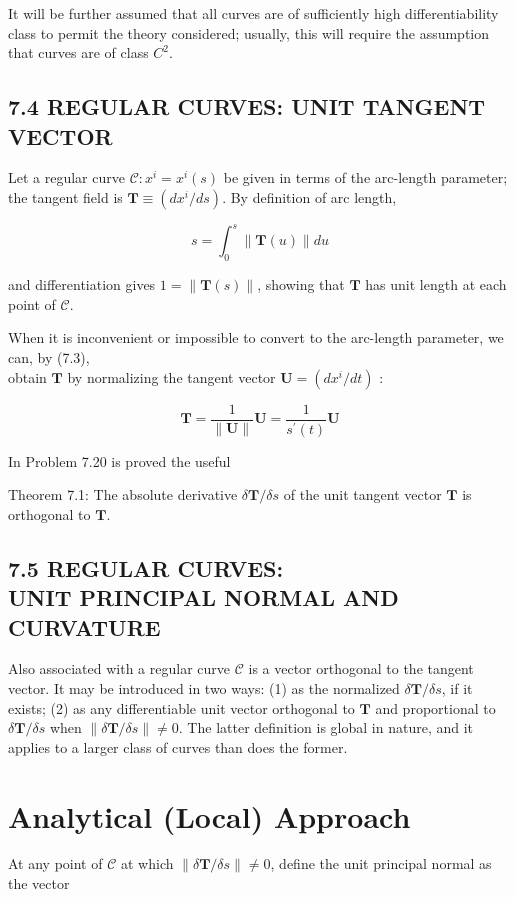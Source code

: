 \documentclass[10pt]{article}
\begin{document}
It will be further assumed that all curves are of sufficiently high differentiability class to permit the theory considered; usually, this will require the assumption that curves are of class $C^{2}$.

\subsection*{7.4 REGULAR CURVES: UNIT TANGENT VECTOR}
Let a regular curve $\mathscr{C}: x^{i}=x^{i}(s)$ be given in terms of the arc-length parameter; the tangent field is $\mathbf{T} \equiv\left(d x^{i} / d s\right)$. By definition of arc length,

$$
s=\int_{0}^{s}\|\mathbf{T}(u)\| d u
$$

and differentiation gives $1=\|\mathbf{T}(s)\|$, showing that $\mathbf{T}$ has unit length at each point of $\mathscr{C}$.

When it is inconvenient or impossible to convert to the arc-length parameter, we can, by (7.3),\\
obtain $\mathbf{T}$ by normalizing the tangent vector $\mathbf{U}=\left(d x^{i} / d t\right)$ :


\begin{equation*}
\mathbf{T}=\frac{1}{\|\mathbf{U}\|} \mathbf{U}=\frac{1}{s^{\prime}(t)} \mathbf{U} \tag{7.4}
\end{equation*}


In Problem 7.20 is proved the useful

Theorem 7.1: The absolute derivative $\delta \mathbf{T} / \delta s$ of the unit tangent vector $\mathbf{T}$ is orthogonal to $\mathbf{T}$.

\subsection*{7.5 REGULAR CURVES: \\
 UNIT PRINCIPAL NORMAL AND CURVATURE}
Also associated with a regular curve $\mathscr{C}$ is a vector orthogonal to the tangent vector. It may be introduced in two ways: (1) as the normalized $\delta \mathbf{T} / \delta s$, if it exists; (2) as any differentiable unit vector orthogonal to $\mathbf{T}$ and proportional to $\delta \mathbf{T} / \delta s$ when $\|\delta \mathbf{T} / \delta s\| \neq 0$. The latter definition is global in nature, and it applies to a larger class of curves than does the former.

\section*{Analytical (Local) Approach}
At any point of $\mathscr{C}$ at which $\|\delta \mathbf{T} / \delta s\| \neq 0$, define the unit principal normal as the vector
\end{document}
